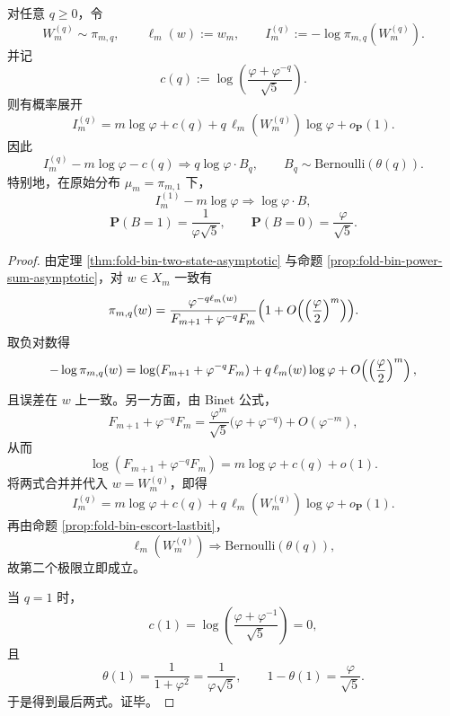 \begin{theorem}[信息谱的二层量子化]\label{thm:xi-time-part9ob-escort-surprisal-two-level-quantization}
对任意 \(q\ge 0\)，令
\[
W_m^{(q)}\sim \pi_{m,q},
\qquad
\ell_m(w):=w_m,
\qquad
I_m^{(q)}:=-\log \pi_{m,q}(W_m^{(q)}).
\]
并记
\[
c(q):=\log\!\left(\frac{\varphi+\varphi^{-q}}{\sqrt5}\right).
\]
则有概率展开
\[
I_m^{(q)}
=
m\log\varphi+c(q)+q\,\ell_m(W_m^{(q)})\log\varphi+o_{\mathbf P}(1).
\]
因此
\[
I_m^{(q)}-m\log\varphi-c(q)
\Longrightarrow
q\log\varphi\cdot B_q,
\qquad
B_q\sim \mathrm{Bernoulli}(\theta(q)).
\]
特别地，在原始分布 \(\mu_m=\pi_{m,1}\) 下，
\[
I_m^{(1)}-m\log\varphi
\Longrightarrow
\log\varphi\cdot B,
\]
\[
\mathbf P(B=1)=\frac{1}{\varphi\sqrt5},
\qquad
\mathbf P(B=0)=\frac{\varphi}{\sqrt5}.
\]
\end{theorem}
\begin{proof}
由定理 \ref{thm:fold-bin-two-state-asymptotic} 与命题 \ref{prop:fold-bin-power-sum-asymptotic}，对 \(w\in X_m\) 一致有
\[
\pi_{m,q}(w)
=
\frac{\varphi^{-q\ell_m(w)}}{F_{m+1}+\varphi^{-q}F_m}
\Bigl(1+O\!\left(\Bigl(\frac{\varphi}{2}\Bigr)^m\right)\Bigr).
\]
取负对数得
\[
-\log \pi_{m,q}(w)
=
\log(F_{m+1}+\varphi^{-q}F_m)
+q\,\ell_m(w)\log\varphi
+O\!\left(\Bigl(\frac{\varphi}{2}\Bigr)^m\right),
\]
且误差在 \(w\) 上一致。另一方面，由 Binet 公式，
\[
F_{m+1}+\varphi^{-q}F_m
=
\frac{\varphi^m}{\sqrt5}\bigl(\varphi+\varphi^{-q}\bigr)+O(\varphi^{-m}),
\]
从而
\[
\log(F_{m+1}+\varphi^{-q}F_m)
=
m\log\varphi+c(q)+o(1).
\]
将两式合并并代入 \(w=W_m^{(q)}\)，即得
\[
I_m^{(q)}
=
m\log\varphi+c(q)+q\,\ell_m(W_m^{(q)})\log\varphi+o_{\mathbf P}(1).
\]
再由命题 \ref{prop:fold-bin-escort-lastbit}，
\[
\ell_m(W_m^{(q)})\Longrightarrow \mathrm{Bernoulli}(\theta(q)),
\]
故第二个极限立即成立。

当 \(q=1\) 时，
\[
c(1)=\log\!\left(\frac{\varphi+\varphi^{-1}}{\sqrt5}\right)=0,
\]
且
\[
\theta(1)=\frac{1}{1+\varphi^2}=\frac{1}{\varphi\sqrt5},
\qquad
1-\theta(1)=\frac{\varphi}{\sqrt5}.
\]
于是得到最后两式。证毕。
\end{proof}

\endinput
